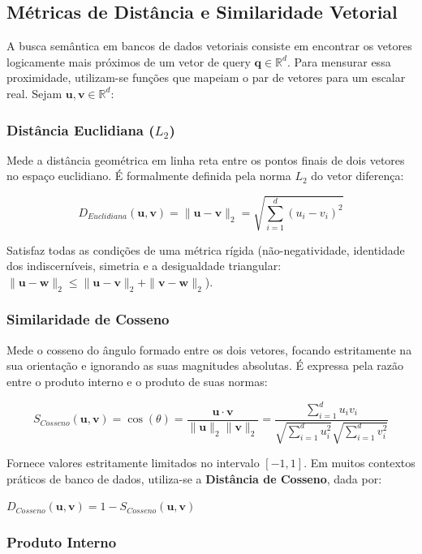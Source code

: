\documentclass[12pt]{article}
\begin{document}
	\subsection{Métricas de Distância e Similaridade Vetorial}
	
	A busca semântica em bancos de dados vetoriais consiste em encontrar os vetores logicamente mais próximos de um vetor de query $\mathbf{q} \in \mathbb{R}^d$. Para mensurar essa proximidade, utilizam-se funções que mapeiam o par de vetores para um escalar real. Sejam $\mathbf{u}, \mathbf{v} \in \mathbb{R}^d$:
	
	\subsubsection{Distância Euclidiana ($L_2$)}
	
	Mede a distância geométrica em linha reta entre os pontos finais de dois vetores no espaço euclidiano. É formalmente definida pela norma $L_2$ do vetor diferença:
	
	$$D_{Euclidiana}(\mathbf{u}, \mathbf{v}) = \|\mathbf{u} - \mathbf{v}\|_2 = \sqrt{\sum_{i=1}^{d} (u_i - v_i)^2}$$
	
	Satisfaz todas as condições de uma métrica rígida (não-negatividade, identidade dos indiscerníveis, simetria e a desigualdade triangular: $\|\mathbf{u} - \mathbf{w}\|_2 \le \|\mathbf{u} - \mathbf{v}\|_2 + \|\mathbf{v} - \mathbf{w}\|_2$).
	
	\subsubsection{Similaridade de Cosseno}
	
	Mede o cosseno do ângulo formado entre os dois vetores, focando estritamente na sua orientação e ignorando as suas magnitudes absolutas. É expressa pela razão entre o produto interno e o produto de suas normas:
	
	$$S_{Cosseno}(\mathbf{u}, \mathbf{v}) = \cos(\theta) = \frac{\mathbf{u} \cdot \mathbf{v}}{\|\mathbf{u}\|_2 \|\mathbf{v}\|_2} = \frac{\sum_{i=1}^{d} u_i v_i}{\sqrt{\sum_{i=1}^{d} u_i^2} \sqrt{\sum_{i=1}^{d} v_i^2}}$$
	
	Fornece valores estritamente limitados no intervalo $[-1, 1]$. Em muitos contextos práticos de banco de dados, utiliza-se a \textbf{Distância de Cosseno}, dada por:
    
    $D_{Cosseno}(\mathbf{u}, \mathbf{v}) = 1 - S_{Cosseno}(\mathbf{u}, \mathbf{v})$
	
	\subsubsection{Produto Interno}
	
\end{document}
